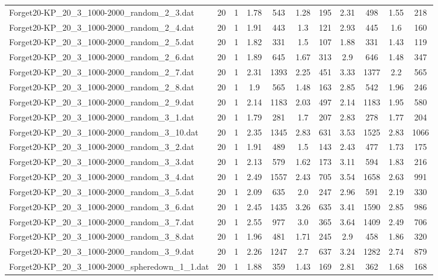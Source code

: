 \begin{table}[!ht]
\begin{tabular}{lcccccccccc}
Forget20-KP\_20\_3\_1000-2000\_random\_2\_3.dat & 20 & 1 & 1.78 & 543 & 1.28 & 195 & 2.31 & 498 & 1.55 & 218 \\
Forget20-KP\_20\_3\_1000-2000\_random\_2\_4.dat & 20 & 1 & 1.91 & 443 & 1.3 & 121 & 2.93 & 445 & 1.6 & 160 \\
Forget20-KP\_20\_3\_1000-2000\_random\_2\_5.dat & 20 & 1 & 1.82 & 331 & 1.5 & 107 & 1.88 & 331 & 1.43 & 119 \\
Forget20-KP\_20\_3\_1000-2000\_random\_2\_6.dat & 20 & 1 & 1.89 & 645 & 1.67 & 313 & 2.9 & 646 & 1.48 & 347 \\
Forget20-KP\_20\_3\_1000-2000\_random\_2\_7.dat & 20 & 1 & 2.31 & 1393 & 2.25 & 451 & 3.33 & 1377 & 2.2 & 565 \\
Forget20-KP\_20\_3\_1000-2000\_random\_2\_8.dat & 20 & 1 & 1.9 & 565 & 1.48 & 163 & 2.85 & 542 & 1.96 & 246 \\
Forget20-KP\_20\_3\_1000-2000\_random\_2\_9.dat & 20 & 1 & 2.14 & 1183 & 2.03 & 497 & 2.14 & 1183 & 1.95 & 580 \\
Forget20-KP\_20\_3\_1000-2000\_random\_3\_1.dat & 20 & 1 & 1.79 & 281 & 1.7 & 207 & 2.83 & 278 & 1.77 & 204 \\
Forget20-KP\_20\_3\_1000-2000\_random\_3\_10.dat & 20 & 1 & 2.35 & 1345 & 2.83 & 631 & 3.53 & 1525 & 2.83 & 1066 \\
Forget20-KP\_20\_3\_1000-2000\_random\_3\_2.dat & 20 & 1 & 1.91 & 489 & 1.5 & 143 & 2.43 & 477 & 1.73 & 175 \\
Forget20-KP\_20\_3\_1000-2000\_random\_3\_3.dat & 20 & 1 & 2.13 & 579 & 1.62 & 173 & 3.11 & 594 & 1.83 & 216 \\
Forget20-KP\_20\_3\_1000-2000\_random\_3\_4.dat & 20 & 1 & 2.49 & 1557 & 2.43 & 705 & 3.54 & 1658 & 2.63 & 991 \\
Forget20-KP\_20\_3\_1000-2000\_random\_3\_5.dat & 20 & 1 & 2.09 & 635 & 2.0 & 247 & 2.96 & 591 & 2.19 & 330 \\
Forget20-KP\_20\_3\_1000-2000\_random\_3\_6.dat & 20 & 1 & 2.45 & 1435 & 3.26 & 635 & 3.41 & 1590 & 2.85 & 986 \\
Forget20-KP\_20\_3\_1000-2000\_random\_3\_7.dat & 20 & 1 & 2.55 & 977 & 3.0 & 365 & 3.64 & 1409 & 2.49 & 706 \\
Forget20-KP\_20\_3\_1000-2000\_random\_3\_8.dat & 20 & 1 & 1.96 & 481 & 1.71 & 245 & 2.9 & 458 & 1.86 & 320 \\
Forget20-KP\_20\_3\_1000-2000\_random\_3\_9.dat & 20 & 1 & 2.26 & 1247 & 2.7 & 637 & 3.24 & 1282 & 2.74 & 879 \\
Forget20-KP\_20\_3\_1000-2000\_spheredown\_1\_1.dat & 20 & 1 & 1.88 & 359 & 1.43 & 169 & 2.81 & 362 & 1.68 & 168 \\

\end{tabular}
\end{table}
